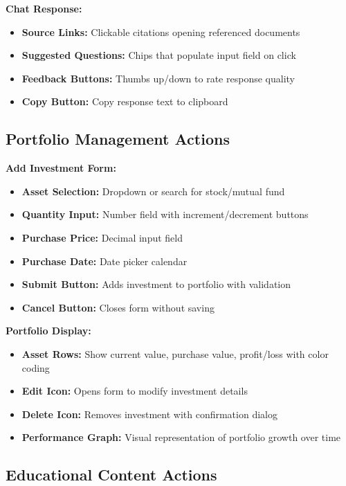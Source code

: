 \documentclass[12pt,a4paper]{report}
\begin{document}
\textbf{Chat Response:}
\begin{itemize}
    \item \textbf{Source Links:} Clickable citations opening referenced documents
    \item \textbf{Suggested Questions:} Chips that populate input field on click
    \item \textbf{Feedback Buttons:} Thumbs up/down to rate response quality
    \item \textbf{Copy Button:} Copy response text to clipboard
\end{itemize}

\subsection{Portfolio Management Actions}

\textbf{Add Investment Form:}
\begin{itemize}
    \item \textbf{Asset Selection:} Dropdown or search for stock/mutual fund
    \item \textbf{Quantity Input:} Number field with increment/decrement buttons
    \item \textbf{Purchase Price:} Decimal input field
    \item \textbf{Purchase Date:} Date picker calendar
    \item \textbf{Submit Button:} Adds investment to portfolio with validation
    \item \textbf{Cancel Button:} Closes form without saving
\end{itemize}

\textbf{Portfolio Display:}
\begin{itemize}
    \item \textbf{Asset Rows:} Show current value, purchase value, profit/loss with color coding
    \item \textbf{Edit Icon:} Opens form to modify investment details
    \item \textbf{Delete Icon:} Removes investment with confirmation dialog
    \item \textbf{Performance Graph:} Visual representation of portfolio growth over time
\end{itemize}

\subsection{Educational Content Actions}
\end{document}

